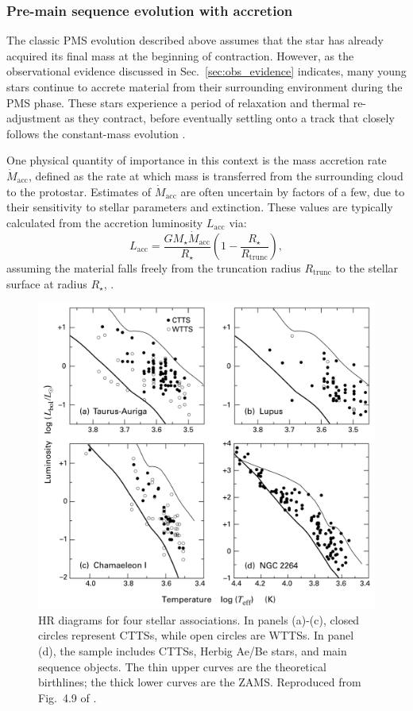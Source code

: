 \documentclass[12pt,a4paper]{article}
\newcommand{\mr}{\mathrm}
\begin{document}
\subsubsection{Pre-main sequence evolution with accretion}
\label{sec:pms_accretion}

The classic PMS evolution described above assumes that the star has already acquired its final mass at the beginning of contraction. However, as the observational evidence discussed in Sec.~\ref{sec:obs_evidence} indicates, many young stars continue to accrete material from their surrounding environment during the PMS phase. These stars experience a period of relaxation and thermal re-adjustment as they contract, before eventually settling onto a track that closely follows the constant-mass evolution \parencite{KippenhahnEtAl2013}.

One physical quantity of importance in this context is the mass accretion rate $\dot{M}_\mr{acc}$,  defined as the rate at which mass is transferred from the surrounding cloud to the protostar. Estimates of $\dot{M}_\mr{acc}$ are often uncertain by factors of a few, due to their sensitivity to stellar parameters and extinction. These values are typically calculated from the accretion luminosity $L_\mr{acc}$ via:
\begin{equation}
  L_\mr{acc} = \frac{GM_\star \dot{M}_\mr{acc}}{R_\star}\left(1 - \frac{R_\star}{R_\mr{trunc}}\right),
\end{equation}
assuming the material falls freely from the truncation radius $R_\mr{trunc}$ to the stellar surface at radius $R_\star$, \parencite[see review by][]{HartmannEtAl2016}. 

\begin{figure}[htbp]
  \centering
  \includegraphics[width=.85\textwidth]{StahlerPalla2004_fig4p9.png}
  \caption{HR diagrams for four stellar associations. In panels (a)-(c), closed circles represent CTTSs, while open circles are WTTSs. In panel (d), the sample includes CTTSs, Herbig Ae/Be stars, and main sequence objects. The thin upper curves are the theoretical birthlines; the thick lower curves are the ZAMS. Reproduced from Fig.~4.9 of \textcite{StahlerPalla2004}.} \label{fig:obs_birthline} 
\end{figure}
\end{document}
